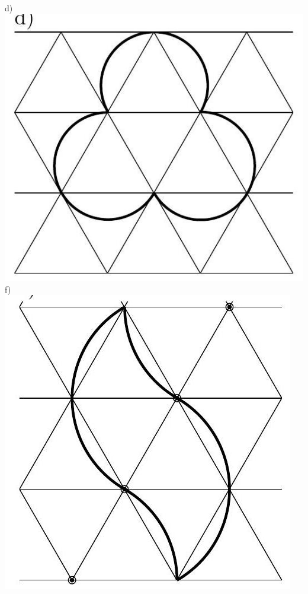\documentclass[10pt]{article}
\begin{document}
\begin{enumerate}
d)\\
\includegraphics[max width=\textwidth, center]{2024_11_21_e9b4faa005d5be2cc318g-063}\\
f)\\
\includegraphics[max width=\textwidth, center]{2024_11_21_e9b4faa005d5be2cc318g-063(3)}

\end{enumerate}
\end{document}
